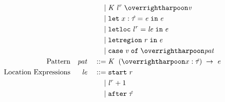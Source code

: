 \begin{displaymath}
\begin{aligned}
    && && \gramor & \datacon{\DC}{\keywd{\locreg{\loc}{\reg}}}{\overharpoon{\VAL}}\\
    && && \gramor & \letpack{\var:\hTYP}{\EXPR}{\EXPR} \\
    && && \gramor & \letloc{\locreg{\loc}{\reg}}{\LE}{\EXPR} \\
    && && \gramor & \letreg{\reg}{\EXPR} \\
    && && \gramor & \case{\VAL}{\overharpoon{\pat}} \\
    \textup{Pattern} && \pat && \gramdef &
    \caseclause{\datacon{\DC}{}{(\overharpoon{\var : \hTYP})}}{\EXPR} \\
    \textup{Location Expressions} && \LE && \gramdef
    & \startr{\reg} \\
    && && \gramor & \locreg{\loc}{r} + 1 \\
    && && \gramor & \afterl{\hTYP}
  \end{aligned}
\end{displaymath}
